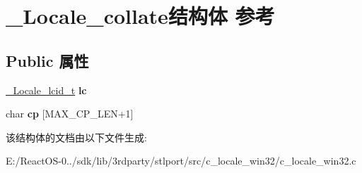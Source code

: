 \hypertarget{struct___locale__collate}{}\section{\+\_\+\+Locale\+\_\+collate结构体 参考}
\label{struct___locale__collate}
\subsection*{Public 属性}
\begin{DoxyCompactItemize}
\item 
\mbox{\label{struct___locale__collate_aeef0a198ac22670972c45895cbd6a6a6}} 
\hyperlink{struct___locale__name__hint}{\+\_\+\+Locale\+\_\+lcid\+\_\+t} {\bfseries lc}
\item 
\mbox{\label{struct___locale__collate_ada9fd31cea00e5bb974bea5a6e14e78b}} 
char {\bfseries cp} \mbox{[}M\+A\+X\+\_\+\+C\+P\+\_\+\+L\+EN+1\mbox{]}
\end{DoxyCompactItemize}


该结构体的文档由以下文件生成\+:\begin{DoxyCompactItemize}
\item 
E\+:/\+React\+O\+S-\/0../sdk/lib/3rdparty/stlport/src/c\+\_\+locale\+\_\+win32/c\+\_\+locale\+\_\+win32.\+c\end{DoxyCompactItemize}
